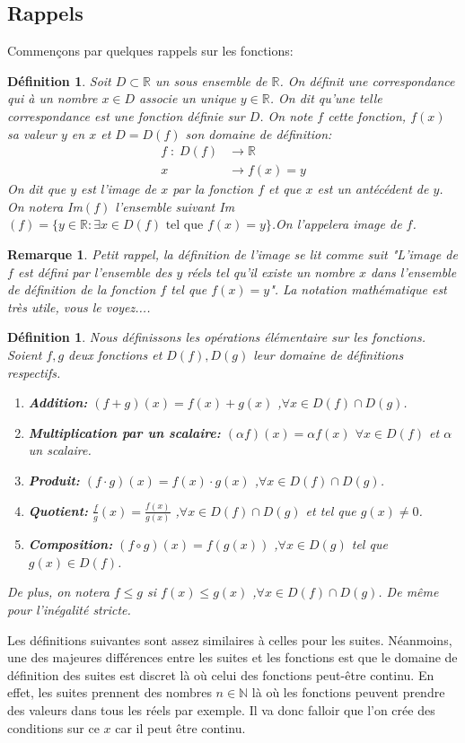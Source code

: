 \documentclass[a4paper, 12pt, french, twoside]{article}
\newtheorem{defi}[theorem]{Définition}
\newtheorem{rem}[theorem]{Remarque}
\newcommand{\Nn}{{\mathbb{N}}}
\newcommand{\Rr}{{\mathbb{R}}}
\begin{document}
\subsection{Rappels}
Commençons par quelques rappels sur les fonctions: 
\begin{defi}
    Soit $D\subset \Rr$ un sous ensemble de $\Rr$. On définit une correspondance qui à un nombre $x\in D$ associe un unique $y\in \Rr$. On dit qu'une telle correspondance est une fonction définie sur $D$. On note $f$ cette fonction, $f(x)$ sa valeur $y$ en $x$ et $D=D(f)$ son domaine de définition: 
    \begin{align*}
        f\; : \; D(f)&\longrightarrow \Rr\\
        x\; &\longrightarrow f(x)=y
    \end{align*}
  On dit que $y$ est l'image de $x$ par la fonction $f$ et que $x$ est un antécédent de $y$. On notera Im$(f)$ l'ensemble suivant Im$(f)=\{y\in \Rr : \exists x \in D(f) \text{ tel que } f(x)=y\}$.On l'appelera image de $f$.

\end{defi}
\begin{rem}
 Petit rappel, la définition de l'image se lit comme suit "L'image de $f$ est défini par l'ensemble des $y$ réels tel qu'il existe un nombre $x$ dans l'ensemble de définition de la fonction $f$ tel que $f(x)=y$". La notation mathématique est très utile, vous le voyez....     
\end{rem}
 
\begin{defi}
    Nous définissons les opérations élémentaire sur les fonctions. Soient $f,g$ deux fonctions et $D(f), D(g)$ leur domaine de définitions respectifs. 
    \begin{enumerate}
        \item \textbf{Addition:} $(f+g)(x)=f(x)+g(x)$ ,$\forall x \in D(f)\cap D(g)$.
        \item \textbf{Multiplication par un scalaire:} $(\alpha f)(x)=\alpha f(x)$ $\forall x\in D(f)$ et $\alpha$ un scalaire.
        \item \textbf{Produit:} $(f\cdot g)(x)=f(x)\cdot g(x)$ ,$\forall x \in D(f)\cap D(g)$.
        \item \textbf{Quotient:} $\frac{f}{g}(x)=\frac{f(x)}{g(x)}$ ,$\forall x \in D(f)\cap D(g)$ et tel que $g(x)\neq 0$.
        \item \textbf{Composition:} $(f\circ g)(x)=f(g(x))$ ,$\forall x \in D(g)$ tel que $g(x)\in D(f)$.
    \end{enumerate}
    De plus, on notera $f\leq g$ si $f(x)\leq g(x)$ ,$\forall x \in D(f)\cap D(g)$. De même pour l'inégalité stricte. 
\end{defi}
Les définitions suivantes sont assez similaires à celles pour les suites. Néanmoins, une des majeures différences entre les suites et les fonctions est que le domaine de définition des suites est discret là où celui des fonctions peut-être continu. En effet, les suites prennent des nombres $n\in \Nn$ là où les fonctions peuvent prendre des valeurs dans tous les réels par exemple. Il va donc falloir que l'on crée des conditions sur ce $x$ car il peut être continu.
\end{document}
